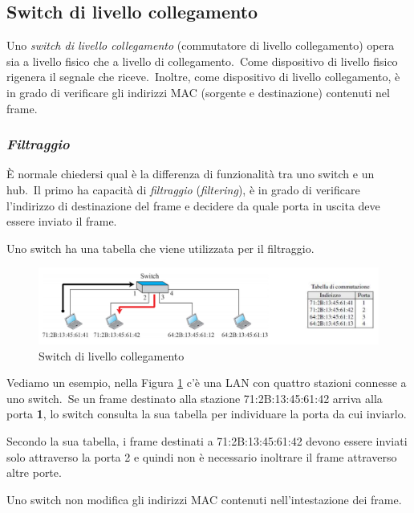 \subsection{Switch di livello collegamento}

Uno \emph{switch di livello collegamento} (commutatore di livello collegamento) opera sia a livello fisico che a livello di collegamento.\
Come dispositivo di livello fisico rigenera il segnale che riceve.\
Inoltre, come dispositivo di livello collegamento, è in grado di verificare gli indirizzi MAC (sorgente e destinazione) contenuti nel frame.

\subsubsection{\emph{Filtraggio}}

È normale chiedersi qual è la differenza di funzionalità tra uno switch e un hub.\
Il primo ha capacità di \emph{filtraggio} (\emph{filtering}), è in grado di verificare l'indirizzo di destinazione del frame e decidere da quale porta in uscita deve essere inviato il frame.

\begin{center}
    Uno switch ha una tabella che viene utilizzata per il filtraggio.
\end{center}
\begin{figure}[H]
    \centering
    \includegraphics[width=\textwidth]{immagini/Switch.png}
    \caption{Switch di livello collegamento}
    \label{fig:Switch}
\end{figure}
Vediamo un esempio, nella Figura \ref{fig:Switch} c'è una LAN con quattro stazioni connesse a uno switch.\
Se un frame destinato alla stazione 71:2B:13:45:61:42 arriva alla porta \textbf{1}, lo switch consulta la sua tabella per individuare la porta da cui inviarlo.

Secondo la sua tabella, i frame destinati a 71:2B:13:45:61:42 devono essere inviati solo attraverso la porta 2 e quindi non è necessario inoltrare il frame attraverso altre porte.

\begin{center}
    Uno switch non modifica gli indirizzi MAC contenuti nell'intestazione dei frame.
\end{center}

